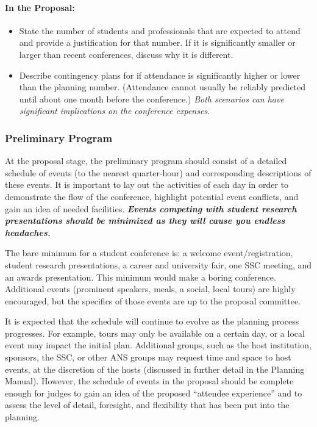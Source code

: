 \documentclass[12pt]{article}
\begin{document}
\paragraph{In the Proposal:}
\begin{itemize}
    \item{State the number of students and professionals that are expected to attend and provide a justification for that number. If it is significantly smaller or larger than recent conferences, discuss why it is different.}
    \item{Describe contingency plans for if attendance is significantly higher or lower than the planning number. (Attendance cannot usually be reliably predicted until about one month before the conference.) \emph{Both scenarios can have significant implications on the conference expenses.}}
\end{itemize}

\subsubsection{Preliminary Program}
At the proposal stage, the preliminary program should consist of a detailed schedule of events (to the nearest quarter-hour) and corresponding descriptions of these events. It is important to lay out the activities of each day in order to demonstrate the flow of the conference, highlight potential event conflicts, and gain an idea of needed facilities. \textit{\textbf{Events competing with student research presentations should be minimized as they will cause you endless headaches.}}

The bare minimum for a student conference is: a welcome event/registration, student research presentations, a career and university fair, one SSC meeting, and an awards presentation. This minimum would make a boring conference. Additional events (prominent speakers, meals, a social, local tours) are highly encouraged, but the specifics of those events are up to the proposal committee.

It is expected that the schedule will continue to evolve as the planning process progresses. For example, tours may only be available on a certain day, or a local event may impact the initial plan. Additional groups, such as the host institution, sponsors, the SSC, or other ANS groups may request time and space to host events, at the discretion of the hosts (discussed in further detail in the Planning Manual). However, the schedule of events in the proposal should be complete enough for judges to gain an idea of the proposed ``attendee experience” and to assess the level of detail, foresight, and flexibility that has been put into the planning.
\end{document}
